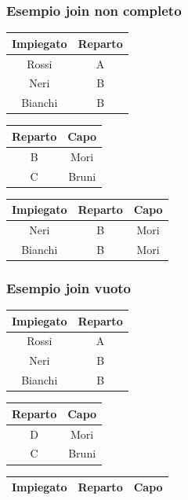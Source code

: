 \documentclass[../main.tex]{subfiles}
\begin{document}
	\subsubsection{Esempio join non completo}
	\begin{center}
		\begin{tabular}{ |c|c| }
			\hline
			\textbf{Impiegato} & \textbf{Reparto}\\
			\hline
			Rossi & A\\
			Neri & B\\
			Bianchi & B\\
			\hline
		\end{tabular}
		\begin{tabular}{ |c|c| }
			\hline
			\textbf{Reparto} & \textbf{Capo}\\
			\hline
			B & Mori \\
			C & Bruni \\
			\hline
		\end{tabular}
	\end{center}
	\begin{center}
		\begin{tabular}{ |c|c|c| }
			\hline
			\textbf{Impiegato} & \textbf{Reparto} & \textbf{Capo}\\
			\hline
			Neri & B & Mori\\
			Bianchi & B & Mori\\
			\hline
		\end{tabular}
	\end{center}
	\subsubsection{Esempio join vuoto}
	\begin{center}
		\begin{tabular}{ |c|c| }
			\hline
			\textbf{Impiegato} & \textbf{Reparto}\\
			\hline
			Rossi & A\\
			Neri & B\\
			Bianchi & B\\
			\hline
		\end{tabular}
		\begin{tabular}{ |c|c| }
			\hline
			\textbf{Reparto} & \textbf{Capo}\\
			\hline
			D & Mori \\
			C & Bruni \\
			\hline
		\end{tabular}
	\end{center}
	\begin{center}
		\begin{tabular}{ |c|c|c| }
			\hline
			\textbf{Impiegato} & \textbf{Reparto} & \textbf{Capo}\\
			\hline
		\end{tabular}
	\end{center}
\end{document}
